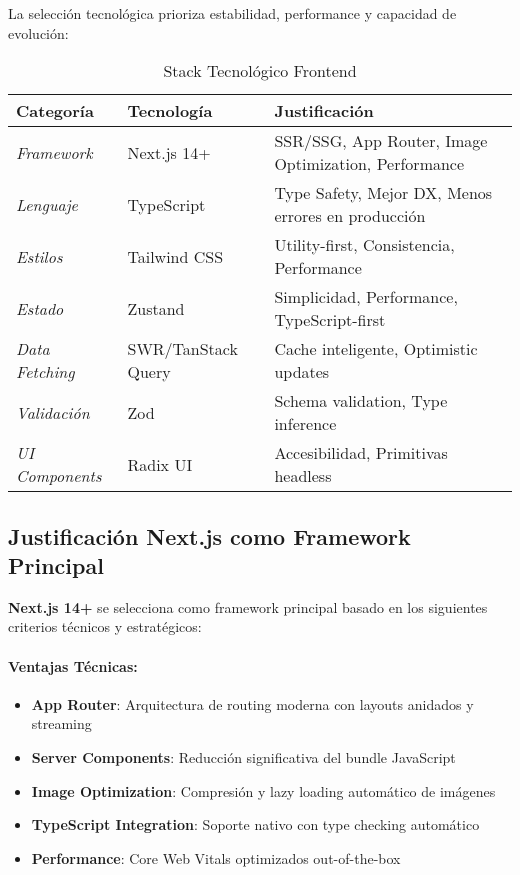 \documentclass[12pt,a4paper]{article}
\begin{document}
La selección tecnológica prioriza estabilidad, performance y capacidad de evolución:

\begin{table}[h!]
\centering
\begin{tabularx}{\textwidth}{|l|l|X|}
\hline
\textbf{Categoría} & \textbf{Tecnología} & \textbf{Justificación} \\
\hline
\textit{Framework} & Next.js 14+ & SSR/SSG, App Router, Image Optimization, Performance \\
\hline
\textit{Lenguaje} & TypeScript & Type Safety, Mejor DX, Menos errores en producción \\
\hline
\textit{Estilos} & Tailwind CSS & Utility-first, Consistencia, Performance \\
\hline
\textit{Estado} & Zustand & Simplicidad, Performance, TypeScript-first \\
\hline
\textit{Data Fetching} & SWR/TanStack Query & Cache inteligente, Optimistic updates \\
\hline
\textit{Validación} & Zod & Schema validation, Type inference \\
\hline
\textit{UI Components} & Radix UI & Accesibilidad, Primitivas headless \\
\hline
\end{tabularx}
\caption{Stack Tecnológico Frontend}
\end{table}

\subsection{Justificación Next.js como Framework Principal}

\textbf{Next.js 14+} se selecciona como framework principal basado en los siguientes criterios técnicos y estratégicos:

\paragraph{Ventajas Técnicas:}
\begin{itemize}
    \item \textbf{App Router}: Arquitectura de routing moderna con layouts anidados y streaming
    \item \textbf{Server Components}: Reducción significativa del bundle JavaScript
    \item \textbf{Image Optimization}: Compresión y lazy loading automático de imágenes
    \item \textbf{TypeScript Integration}: Soporte nativo con type checking automático
    \item \textbf{Performance}: Core Web Vitals optimizados out-of-the-box
\end{itemize}
\end{document}
